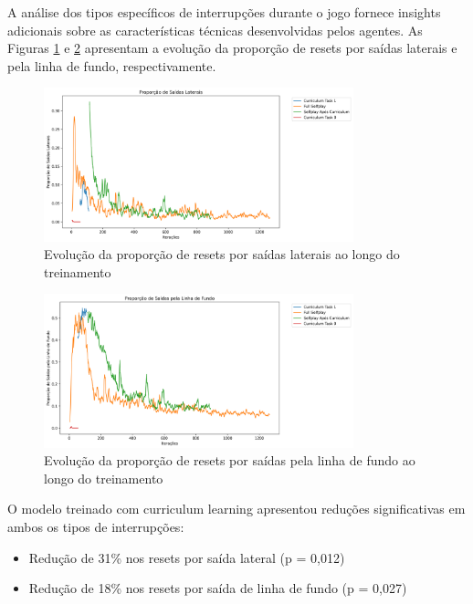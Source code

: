A análise dos tipos específicos de interrupções durante o jogo fornece insights adicionais sobre as características técnicas desenvolvidas pelos agentes. As Figuras \ref{fig:lateral_resets} e \ref{fig:endline_resets} apresentam a evolução da proporção de resets por saídas laterais e pela linha de fundo, respectivamente.

\begin{figure}[H]
    \centering
    \includegraphics[width=0.8\textwidth]{fig/graficos_trabalho/graficos_experimentos/geral/custom_metricslateral_resets_ratio_mean.png}
    \caption{Evolução da proporção de resets por saídas laterais ao longo do treinamento}
    \label{fig:lateral_resets}
\end{figure}

\begin{figure}[H]
    \centering
    \includegraphics[width=0.8\textwidth]{fig/graficos_trabalho/graficos_experimentos/geral/custom_metricsendline_resets_ratio_mean.png}
    \caption{Evolução da proporção de resets por saídas pela linha de fundo ao longo do treinamento}
    \label{fig:endline_resets}
\end{figure}

O modelo treinado com curriculum learning apresentou reduções significativas em ambos os tipos de interrupções:

\begin{itemize}
    \item Redução de 31\% nos resets por saída lateral (p = 0,012)
    \item Redução de 18\% nos resets por saída de linha de fundo (p = 0,027)
\end{itemize}

